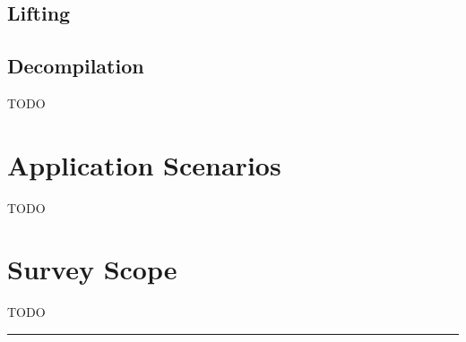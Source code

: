 \subsection{Lifting} \label{sec:background-lifting}



\subsection{Decompilation} \label{sec:background-decompilation}

TODO

\section{Application Scenarios} \label{sec:background-applications}
TODO

\section{Survey Scope} \label{sec:background-scope}
TODO

\noindent\rule{8cm}{0.4pt}

\newpage

